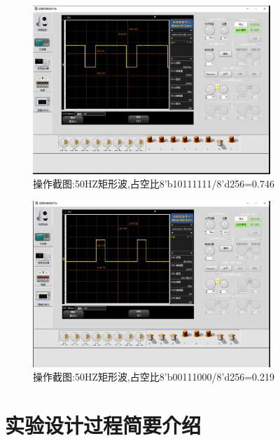 \documentclass[12pt,hyperref,a4paper,UTF8]{ctexart}
\begin{document}
\begin{figure}[H]
    \centering
    \begin{minipage}{0.8\textwidth}
        \centering
        \includegraphics[width=0.8\textwidth]{figures/502.png}
        \caption{操作截图:50HZ矩形波,占空比8'b10111111/8'd256=0.746}
        \label{fig:system_block_diagram}
    \end{minipage}
\end{figure}
\begin{figure}[H]
    \centering
    \begin{minipage}{0.8\textwidth}
        \centering
        \includegraphics[width=0.8\textwidth]{figures/503.png}
        \caption{操作截图:50HZ矩形波,占空比8'b00111000/8'd256=0.219}
        \label{fig:system_block_diagram}
    \end{minipage}
\end{figure}


\section{实验设计过程简要介绍}
\end{document}
